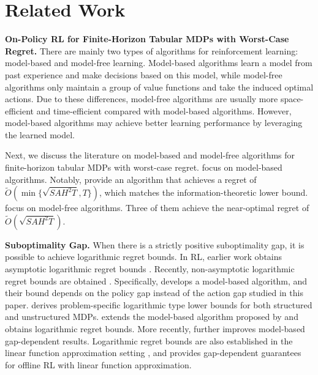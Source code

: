 \documentclass{article}
\begin{document}
\section{Related Work}
\label{related}
\textbf{On-Policy RL for Finite-Horizon Tabular MDPs with Worst-Case Regret.} There are mainly two types of algorithms for reinforcement learning: model-based and model-free learning. Model-based algorithms learn a model from past experience and make decisions based on this model, while model-free algorithms only maintain a group of value functions and take the induced optimal actions. Due to these differences, model-free algorithms are usually more space-efficient and time-efficient compared with model-based algorithms. However, model-based algorithms may achieve better learning performance by leveraging the learned model.

Next, we discuss the literature on model-based and model-free algorithms for finite-horizon tabular MDPs with worst-case regret. \cite{agarwal2020model, agrawal2017optimistic, auer2008near, azar2017minimax, dann2019policy, kakade2018variance, zanette2019tighter, zhang2024settling, zhang2021reinforcement, zhou2023sharp} focus on model-based algorithms. Notably, \cite{zhang2024settling} provide an algorithm that achieves a regret of $\tilde{O}(\min \{\sqrt{SAH^2T},T\})$, which matches the information-theoretic lower bound. \cite{jin2018q, li2023breaking, menard2021ucb, yang2021q, zhang2020almost} focus on model-free algorithms. Three of them \cite{li2023breaking, menard2021ucb, zhang2020almost} achieve the near-optimal regret of $\tilde{O}(\sqrt{SAH^2T})$.

\textbf{Suboptimality Gap.} When there is a strictly positive suboptimality gap, it is possible to achieve logarithmic regret bounds. In RL, earlier work obtains asymptotic logarithmic regret bounds \cite{auer2007logarithmic,tewari2008optimistic}. Recently, non-asymptotic logarithmic regret bounds are obtained \cite{he2021logarithmic, jaksch2010near, ok2018exploration,simchowitz2019non}. Specifically, \cite{jaksch2010near} develops a model-based algorithm, and their bound depends on the policy gap instead of the action gap studied in this paper. \cite{ok2018exploration} derives problem-specific logarithmic type lower bounds for both structured and unstructured MDPs. \cite{simchowitz2019non} extends the model-based algorithm proposed by \cite{zanette2019tighter} and obtains logarithmic regret bounds. More recently, \cite{chen2025sharp} further improves model-based gap-dependent results. Logarithmic regret bounds are also established in the linear function approximation setting \citep{he2021logarithmic}, and \cite{nguyen2023instance} provides gap-dependent guarantees for offline RL with linear function approximation.
\end{document}
